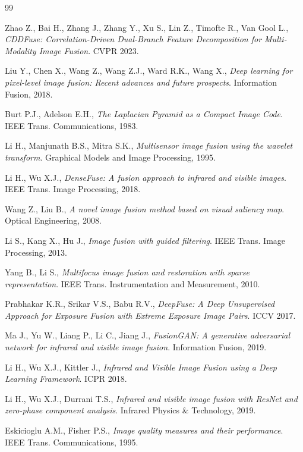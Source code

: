 \documentclass[12pt,a4paper]{article}
\begin{document}
\begin{thebibliography}{99}

Zhao Z., Bai H., Zhang J., Zhang Y., Xu S., Lin Z., Timofte R., Van Gool L., \emph{CDDFuse: Correlation-Driven Dual-Branch Feature Decomposition for Multi-Modality Image Fusion}. CVPR 2023.

Liu Y., Chen X., Wang Z., Wang Z.J., Ward R.K., Wang X., \emph{Deep learning for pixel-level image fusion: Recent advances and future prospects}. Information Fusion, 2018.

Burt P.J., Adelson E.H., \emph{The Laplacian Pyramid as a Compact Image Code}. IEEE Trans. Communications, 1983.

Li H., Manjunath B.S., Mitra S.K., \emph{Multisensor image fusion using the wavelet transform}. Graphical Models and Image Processing, 1995.

Li H., Wu X.J., \emph{DenseFuse: A fusion approach to infrared and visible images}. IEEE Trans. Image Processing, 2018.

Wang Z., Liu B., \emph{A novel image fusion method based on visual saliency map}. Optical Engineering, 2008.

Li S., Kang X., Hu J., \emph{Image fusion with guided filtering}. IEEE Trans. Image Processing, 2013.

Yang B., Li S., \emph{Multifocus image fusion and restoration with sparse representation}. IEEE Trans. Instrumentation and Measurement, 2010.

Prabhakar K.R., Srikar V.S., Babu R.V., \emph{DeepFuse: A Deep Unsupervised Approach for Exposure Fusion with Extreme Exposure Image Pairs}. ICCV 2017.

Ma J., Yu W., Liang P., Li C., Jiang J., \emph{FusionGAN: A generative adversarial network for infrared and visible image fusion}. Information Fusion, 2019.

Li H., Wu X.J., Kittler J., \emph{Infrared and Visible Image Fusion using a Deep Learning Framework}. ICPR 2018.

Li H., Wu X.J., Durrani T.S., \emph{Infrared and visible image fusion with ResNet and zero-phase component analysis}. Infrared Physics \& Technology, 2019.

Eskicioglu A.M., Fisher P.S., \emph{Image quality measures and their performance}. IEEE Trans. Communications, 1995.


\end{thebibliography}
\end{document}
